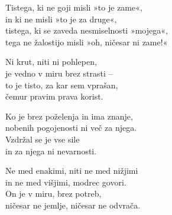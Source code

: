 Tistega, ki ne goji misli »to je zame«,\\
in ki ne misli »to je za druge«,\\
tistega, ki se zaveda nesmiselnosti »mojega«,\\
tega ne žalostijo misli »oh, ničesar ni zame!«

Ni krut, niti ni pohlepen,\\
je vedno v miru brez strasti --\\
to je tisto, za kar sem vprašan,\\
čemur pravim prava korist.

Ko je brez poželenja in ima znanje,\\
nobenih pogojenosti ni več za njega.\\
Vzdržal se je vse sile\\
in za njega ni nevarnosti.

Ne med enakimi, niti ne med nižjimi\\
in ne med višjimi, modrec govori.\\
On je v miru, brez potreb,\\
ničesar ne jemlje, ničesar ne odvrača.

